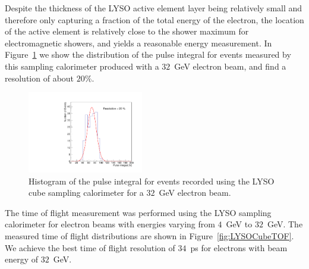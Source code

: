 \documentclass[11pt]{article}
\begin{document}
Despite the thickness of the LYSO active element layer being relatively
small and therefore only capturing a fraction of the total energy
of the electron, the location of the active element is relatively close to the
shower maximum for electromagnetic showers, and yields
a reasonable energy measurement. In Figure~\ref{fig:LYSOCubeEnergy32GeV}
we show the distribution of the pulse integral for events
measured by this sampling calorimeter produced with a
$32$~GeV electron beam, and find a resolution of about $20\%$.


\begin{figure}[h] \centering
\includegraphics[width=0.45\textwidth]{figs/TOF_Electron_LYSOCube_32GeV_energy} 
\caption{ Histogram of the pulse integral for events recorded using
the LYSO cube sampling calorimeter for a $32$~GeV electron beam. } 
\label{fig:LYSOCubeEnergy32GeV}
\end{figure}

The time of flight measurement was performed using the LYSO sampling calorimeter
for electron beams with energies varying from $4$~GeV to $32$~GeV. The 
measured time of flight distributions are shown in Figure~\ref{fig:LYSOCubeTOF}.
We achieve the best time of flight resolution of $34$~ps for electrons
with beam energy of $32$~GeV.
\end{document}
